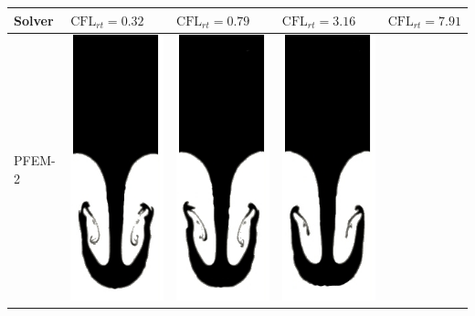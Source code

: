 \begin{table}[H]
\begin{center}
\begin{tabular}{m{} | >{\centering}m{} | >{\centering}m{} | >{\centering}m{} | m{} }
      Solver & $\textrm{CFL}_{rt}=0.32$ & $\textrm{CFL}_{rt}=0.79$ & $\textrm{CFL}_{rt}=3.16$ &$\textrm{CFL}_{rt}=7.91$ \\
      \hline
      PFEM-2 &
      \includegraphics[width=.17\columnwidth]{../images/rayleigh_pfem_dts_A.jpg} &
      \includegraphics[width=.17\columnwidth]{../images/rayleigh_pfem_dts_B.jpg} &
      \includegraphics[width=.17\columnwidth]{../images/rayleigh_pfem_dts_C.jpg} &

\end{tabular}
\end{center}
\end{table}
